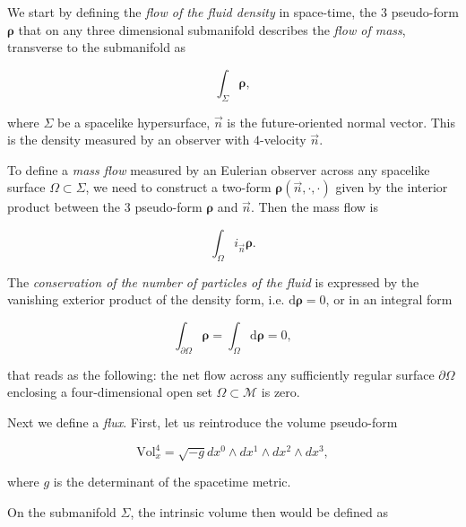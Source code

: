 We start by defining the \textit{flow of the fluid density} in space-time, the $3$ pseudo-form $\boldsymbol{\rho}$ that on any three dimensional submanifold describes the \textit{flow of mass}, transverse to the submanifold as

\begin{equation}
\int_{\Sigma} \boldsymbol{\rho},
\end{equation}

where $\Sigma$ be a spacelike hypersurface, $\vec{n}$ is the future-oriented normal vector. 
This is the density measured by an observer with $4$-velocity $\vec{n}$. 

To define a \textit{mass flow} measured by an Eulerian observer across any spacelike surface $\Omega\subset\Sigma$, we need to construct a two-form $\boldsymbol{\rho}(\vec{n}, \cdot, \cdot)$ given by the interior product between the $3$ pseudo-form $\boldsymbol{\rho}$ and $\vec{n}$. 
Then the mass flow is 

\begin{equation}
\int_{\Omega} i_{\vec{n}}\boldsymbol{\rho}.
\end{equation}

The \textit{conservation of the number of particles of the fluid} is expressed by the vanishing exterior product of the density form, i.e. $\text{d}\boldsymbol{\rho}=0$, or in an integral form 

\begin{equation}
\int_{\partial\Omega} \boldsymbol{\rho} = \int_{\Omega}\text{d}\boldsymbol{\rho} = 0,
\end{equation}

that reads as the following: the net flow across any sufficiently regular surface $\partial\Omega$ enclosing a four-dimensional open set $\Omega\subset\mathcal{M}$ is zero.

Next we define a \textit{flux}. First, let us reintroduce the volume pseudo-form

\begin{equation}
\text{Vol}_x ^4 = \sqrt{-g}dx^0 \wedge dx^1 \wedge dx^2 \wedge dx^3,
\end{equation}

where $g$ is the determinant of the spacetime metric. 

On the submanifold $\Sigma$, the intrinsic volume then would be defined as 

